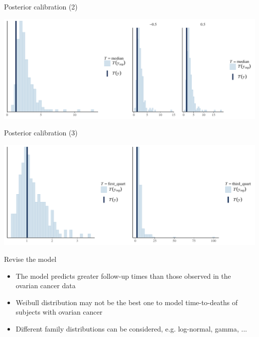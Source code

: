 \documentclass[ignorenonframetext,a4paper]{beamer}
\begin{document}
\begin{frame}{Posterior calibration (2)}

\includegraphics{DB_presentation_case_study_files/figure-beamer/unnamed-chunk-15-1.pdf}

\end{frame}

\begin{frame}{Posterior calibration (3)}

\includegraphics{DB_presentation_case_study_files/figure-beamer/unnamed-chunk-16-1.pdf}

\end{frame}

\begin{frame}{Revise the model}

\begin{itemize}
  \item{The model predicts greater follow-up times than those observed
        in the ovarian cancer data}
  \item{Weibull distribution may not be the best one to model 
        time-to-deaths of subjects with ovarian cancer}
  \item{Different family distributions can be considered, e.g.
        log-normal, gamma, ...}
\end{itemize}

\end{frame}
\end{document}
